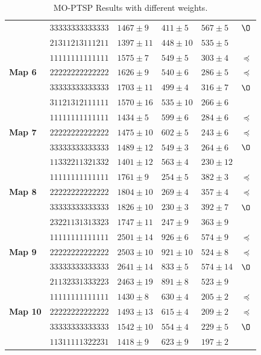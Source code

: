 \documentclass[journal]{IEEEtran}
\begin{document}
\begin{table}[!t]
\begin{center}
\begin{tabular}{|p{0.8cm}|p{1.95cm}|m{1.13cm}|m{1.13cm}|m{1.13cm}|m{0.1cm}|}
 & $33333333333333$ & $1467 \pm 9$ & $411 \pm 5$ & $567 \pm 5$ & $\O$ \\
 & $21311213111211$ & $1397 \pm 11$ & $448 \pm 10$ & $535 \pm 5$ & \\
\hline
 \multirow{3}{*}{\textbf{Map 6}} & $11111111111111$ & $1575 \pm 7$ & $549 \pm 5$& $303 \pm 4$ & $\preceq$ \\
 & $22222222222222$ & $1626 \pm 9$ & $540 \pm 6$ & $286 \pm 5$ & $\preceq$ \\
 & $33333333333333$ & $1703 \pm 11$ & $499 \pm 4$ & $316 \pm 7$ & $\O$ \\
 & $31121312111111$ & $1570 \pm 16$ & $535 \pm 10$ & $266 \pm 6$ & \\
\hline
 \multirow{3}{*}{\textbf{Map 7}} & $11111111111111$ & $1434 \pm 5$ & $599 \pm 6$& $284 \pm 6$ & $\preceq$ \\
 & $22222222222222$ & $1475 \pm 10$ & $602 \pm 5$ & $243 \pm 6$ & $\preceq$ \\
 & $33333333333333$ & $1489 \pm 12$ & $549 \pm 3$ & $264 \pm 6$ & $\O$ \\
 & $11332211321332$ & $1401 \pm 12$ & $563 \pm 4$ & $230 \pm 12$ & \\
\hline
 \multirow{3}{*}{\textbf{Map 8}} & $11111111111111$ & $1761 \pm 9$ & $254 \pm 5$& $382 \pm 3$ & $\preceq$ \\
 & $22222222222222$ & $1804 \pm 10$ & $269 \pm 4$ & $357 \pm 4$ & $\preceq$ \\
 & $33333333333333$ & $1826 \pm 10$ & $230 \pm 3$ & $392 \pm 7$ & $\O$ \\
 & $23221131313323$ & $1747 \pm 11$ & $247 \pm 9$ & $363 \pm 9$ & \\
\hline
 \multirow{3}{*}{\textbf{Map 9}} & $11111111111111$ & $2501 \pm 14$ & $926 \pm 6$& $574 \pm 9$ & $\preceq$ \\
 & $22222222222222$ & $2503 \pm 10$ & $921 \pm 10$ & $524 \pm 8$ & $\preceq$ \\
 & $33333333333333$ & $2641 \pm 14$ & $833 \pm 5$ & $574 \pm 14$ & $\O$ \\
 & $21132331333223$ & $2463 \pm 19$ & $891 \pm 8$ & $523 \pm 9$ & \\
\hline
 \multirow{3}{*}{\textbf{Map 10}} & $11111111111111$ & $1430 \pm 8$ & $630 \pm 4$& $205 \pm 2$ & $\preceq$ \\
 & $22222222222222$ & $1493 \pm 13$ & $615 \pm 4$ & $209 \pm 2$ & $\preceq$ \\
 & $33333333333333$ & $1542 \pm 10$ & $554 \pm 4$ & $229 \pm 5$ & $\O$ \\
 & $11311111322231$ & $1418 \pm 9$ & $623 \pm 9$ & $197 \pm 2$ & \\
\hline
\end{tabular}
\caption{MO-PTSP Results with different weights.}
\label{tab:resVarW}
\end{center}
\end{table}
\end{document}
